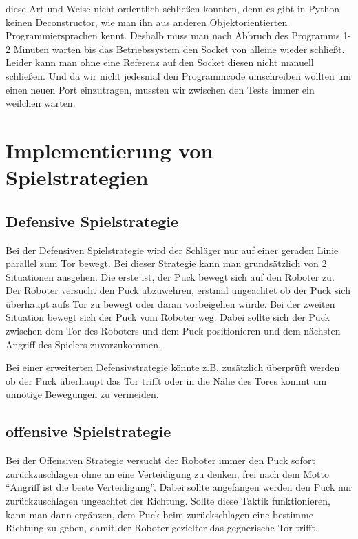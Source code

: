 diese Art und Weise nicht ordentlich schließen konnten, denn es gibt in Python keinen Deconstructor, wie man ihn aus anderen Objektorientierten Programmiersprachen kennt. Deshalb muss man nach Abbruch des Programms 1-2 Minuten warten bis das Betriebssystem den Socket von alleine wieder schließt. Leider kann man ohne eine Referenz auf den Socket diesen nicht manuell schließen. Und da wir nicht jedesmal den Programmcode umschreiben wollten um einen neuen Port einzutragen, mussten wir zwischen den Tests immer ein weilchen warten.

\section{Implementierung von Spielstrategien}
\subsection{Defensive Spielstrategie}
Bei der Defensiven Spielstrategie wird der Schläger nur auf einer geraden Linie parallel zum Tor bewegt. Bei dieser Strategie kann man grundsätzlich von 2 Situationen ausgehen. Die erste ist, der Puck bewegt sich auf den Roboter zu. Der Roboter versucht den Puck abzuwehren, erstmal ungeachtet ob der Puck sich überhaupt aufs Tor zu bewegt oder daran vorbeigehen würde. Bei der zweiten Situation bewegt sich der Puck vom Roboter weg. Dabei sollte sich der Puck zwischen dem Tor des Roboters und dem Puck positionieren und dem nächsten Angriff des Spielers zuvorzukommen.

Bei einer erweiterten Defensivstrategie könnte z.B. zusätzlich überprüft werden ob der Puck überhaupt das Tor trifft oder in die Nähe des Tores kommt um unnötige Bewegungen zu vermeiden.

\subsection{offensive Spielstrategie}
Bei der Offensiven Strategie versucht der Roboter immer den Puck sofort zurückzuschlagen ohne an eine Verteidigung zu denken, frei nach dem Motto “Angriff ist die beste Verteidigung”. Dabei sollte angefangen werden den Puck nur zurückzuschlagen ungeachtet der Richtung. Sollte diese Taktik funktionieren, kann man dann ergänzen, dem Puck beim zurückschlagen eine bestimme Richtung zu geben, damit der Roboter gezielter das gegnerische Tor trifft.

